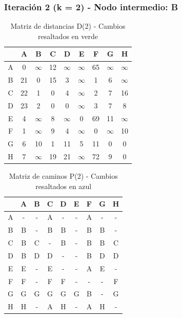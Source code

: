 \documentclass[12pt]{article}
\begin{document}
\clearpage
\subsubsection{Iteración 2 (k = 2) - Nodo intermedio: B}
\begin{table}[h!]
\centering
\begin{tabular}{|c|c|c|c|c|c|c|c|c|}
\hline
 & A & B & C & D & E & F & G & H \\\hline
A & 0 & $\infty$ & 12 & $\infty$ & $\infty$ & 65 & $\infty$ & $\infty$ \\\hline
B & 21 & 0 & 15 & 3 & $\infty$ & 1 & 6 & $\infty$ \\\hline
C & \cellcolor{lightgreen} 22 & 1 & 0 & \cellcolor{lightgreen} 4 & $\infty$ & \cellcolor{lightgreen} 2 & \cellcolor{lightgreen} 7 & 16 \\\hline
D & \cellcolor{lightgreen} 23 & 2 & 0 & 0 & $\infty$ & \cellcolor{lightgreen} 3 & 7 & 8 \\\hline
E & 4 & $\infty$ & 8 & $\infty$ & 0 & 69 & 11 & $\infty$ \\\hline
F & 1 & $\infty$ & 9 & 4 & $\infty$ & 0 & $\infty$ & 10 \\\hline
G & 6 & 10 & 1 & 11 & 5 & \cellcolor{lightgreen} 11 & 0 & 0 \\\hline
H & 7 & $\infty$ & 19 & 21 & $\infty$ & 72 & 9 & 0 \\\hline
\end{tabular}
\caption{Matriz de distancias D(2) - Cambios resaltados en verde}
\end{table}

\begin{table}[h!]
\centering
\begin{tabular}{|c|c|c|c|c|c|c|c|c|}
\hline
 & A & B & C & D & E & F & G & H \\\hline
A & - & - & A & - & - & A & - & - \\\hline
B & B & - & B & B & - & B & B & - \\\hline
C & \cellcolor{lightblue} B & C & - & \cellcolor{lightblue} B & - & \cellcolor{lightblue} B & \cellcolor{lightblue} B & C \\\hline
D & \cellcolor{lightblue} B & D & D & - & - & \cellcolor{lightblue} B & D & D \\\hline
E & E & - & E & - & - & A & E & - \\\hline
F & F & - & F & F & - & - & - & F \\\hline
G & G & G & G & G & G & \cellcolor{lightblue} B & - & G \\\hline
H & H & - & A & H & - & A & H & - \\\hline
\end{tabular}
\caption{Matriz de caminos P(2) - Cambios resaltados en azul}
\end{table}
\end{document}
